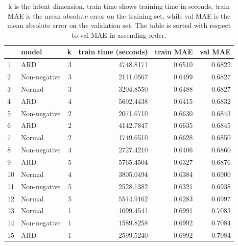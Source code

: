 \documentclass[12pt]{article}
\begin{document}
    \begin{table}[H]
        \centering
        \caption{k is the latent dimension, train time shows training time in seconds, train MAE is the mean absolute error on the training set, while val MAE is the mean absolute error on the validation set. The table is sorted with respect to val MAE in ascending order.}
        \label{table:modelselection}
        \begin{tabular}{llrr|rr}
            \toprule
            {} &         model &  k &  train time (seconds) &  train MAE &  val MAE \\
            \midrule
            1  &           ARD &  3 &             4748.8171 &     0.6510 &   0.6822 \\
            2  &  Non-negative &  3 &             2111.0567 &     0.6499 &   0.6827 \\
            3  &        Normal &  3 &             3204.8550 &     0.6488 &   0.6827 \\
            4  &           ARD &  4 &             5602.4438 &     0.6415 &   0.6832 \\
            5  &  Non-negative &  2 &             2071.6710 &     0.6630 &   0.6843 \\
            6  &           ARD &  2 &             4142.7847 &     0.6635 &   0.6845 \\
            7  &        Normal &  2 &             1749.6510 &     0.6628 &   0.6850 \\
            8  &  Non-negative &  4 &             2727.4210 &     0.6406 &   0.6860 \\
            9  &           ARD &  5 &             5765.4504 &     0.6327 &   0.6876 \\
            10 &        Normal &  4 &             3805.0494 &     0.6384 &   0.6900 \\
            11 &  Non-negative &  5 &             2528.1382 &     0.6321 &   0.6938 \\
            12 &        Normal &  5 &             5514.9162 &     0.6283 &   0.6997 \\
            13 &        Normal &  1 &             1099.4541 &     0.6991 &   0.7083 \\
            14 &  Non-negative &  1 &             1589.8258 &     0.6992 &   0.7084 \\
            15 &           ARD &  1 &             2599.5240 &     0.6992 &   0.7084 \\
            \bottomrule
        \end{tabular}
    \end{table}
    
\end{document}
